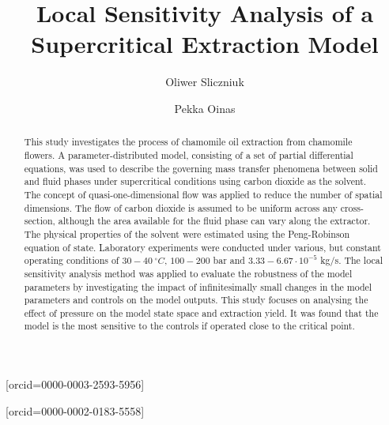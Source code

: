 \documentclass[a4paper,fleqn]{cas-dc}
\begin{document}
 
	
	\title[mode=title]{Local Sensitivity Analysis of a Supercritical Extraction Model}                      
	
	
	\author[1]{Oliwer Sliczniuk}[orcid=0000-0003-2593-5956]
	\cormark[1]
	
	\author[1]{Pekka Oinas}[orcid=0000-0002-0183-5558]
	
	
	\address[1]{Aalto University, School of Chemical Engineering, Espoo, 02150, Finland}
	
	
	\begin{abstract}
	This study investigates the process of chamomile oil extraction from chamomile flowers. A parameter-distributed model, consisting of a set of partial differential equations, was used to describe the governing mass transfer phenomena between solid and fluid phases under supercritical conditions using carbon dioxide as the solvent. The concept of quasi-one-dimensional flow was applied to reduce the number of spatial dimensions. The flow of carbon dioxide is assumed to be uniform across any cross-section, although the area available for the fluid phase can vary along the extractor. The physical properties of the solvent were estimated using the Peng-Robinson equation of state. Laboratory experiments were conducted under various, but constant operating conditions of $30 - 40~^\circ C$, $100 - 200$ bar and $3.33-6.67 \cdot 10^{-5}$ kg/s. The local sensitivity analysis method was applied to evaluate the robustness of the model parameters by investigating the impact of infinitesimally small changes in the model parameters and controls on the model outputs. This study focuses on analysing the effect of pressure on the model state space and extraction yield. It was found that the model is the most sensitive to the controls if operated close to the critical point.
		
	\end{abstract}
	
\end{document}
